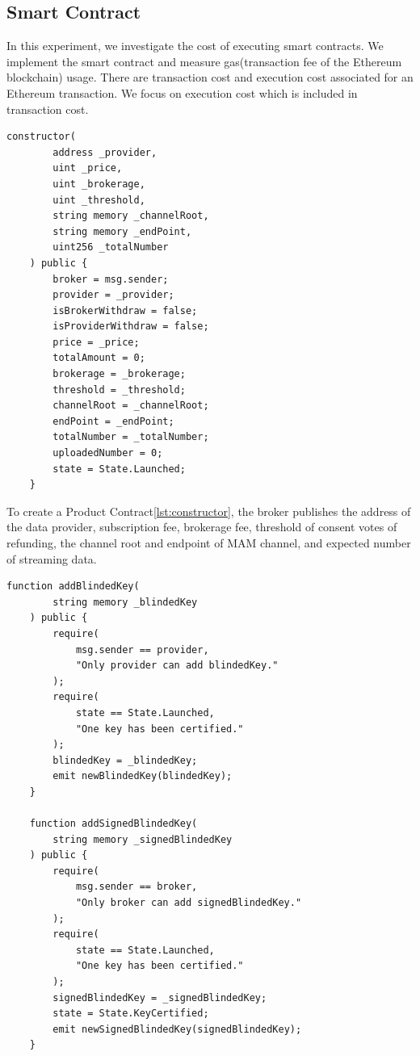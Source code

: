 \documentclass[journal,article,applsci,submit,moreauthors,pdftex]{Definitions/mdpi}
\begin{document}
\subsection{Smart Contract}

In this experiment, we investigate the cost of executing smart contracts. We implement the smart contract and measure gas(transaction fee of the Ethereum blockchain) usage. There are transaction cost and execution cost associated for an Ethereum transaction. We focus on execution cost which is included in transaction cost.

\lstset{style=solidity}

\begin{lstlisting}[caption={generate contract}, label={lst:constructor}, frame=single]
	constructor(
		address _provider,
		uint _price,
		uint _brokerage,
		uint _threshold,
		string memory _channelRoot,
		string memory _endPoint,
		uint256 _totalNumber
	) public {
		broker = msg.sender;
		provider = _provider;
		isBrokerWithdraw = false;
		isProviderWithdraw = false;
		price = _price;
		totalAmount = 0;
		brokerage = _brokerage;
		threshold = _threshold;
		channelRoot = _channelRoot;
		endPoint = _endPoint;
		totalNumber = _totalNumber;
		uploadedNumber = 0;
		state = State.Launched;
	}
\end{lstlisting}

To create a Product Contract\ref{lst:constructor}, the broker publishes the address of the data provider, subscription fee, brokerage fee, threshold of consent votes of refunding, the channel root and endpoint of MAM channel, and expected number of streaming data.

\begin{lstlisting}[caption={update blinded key and update signature}, label={lst:key_certification}, frame=single]
	function addBlindedKey(
		string memory _blindedKey
	) public {
		require(
			msg.sender == provider,
			"Only provider can add blindedKey."
		);
		require(
			state == State.Launched,
			"One key has been certified."
		);
		blindedKey = _blindedKey;
		emit newBlindedKey(blindedKey);
	}
	
	function addSignedBlindedKey(
		string memory _signedBlindedKey
	) public {
		require(
			msg.sender == broker,
			"Only broker can add signedBlindedKey."
		);
		require(
			state == State.Launched,
			"One key has been certified."
		);
		signedBlindedKey = _signedBlindedKey;
		state = State.KeyCertified;
		emit newSignedBlindedKey(signedBlindedKey);
	}
\end{lstlisting}
\end{document}
